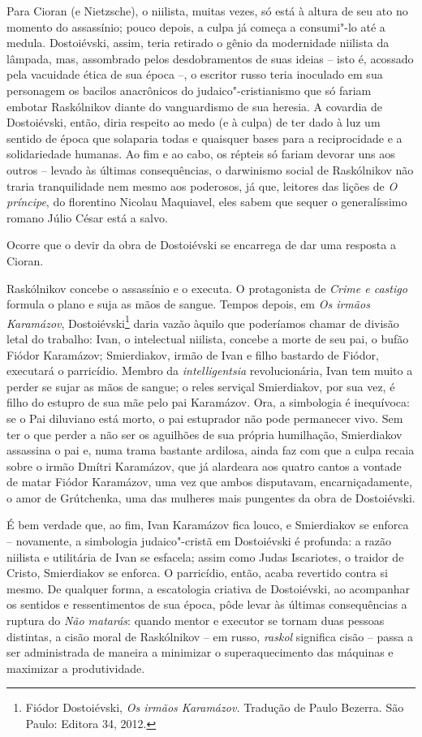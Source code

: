 Para Cioran (e Nietzsche), o niilista, muitas vezes, só está à altura de
seu ato no momento do assassínio; pouco depois, a culpa já começa a
consumi"-lo até a medula. Dostoiévski, assim, teria retirado o gênio da
modernidade niilista da lâmpada, mas, assombrado pelos desdobramentos de
suas ideias -- isto é, acossado pela vacuidade ética de sua época --, o
escritor russo teria inoculado em sua personagem os bacilos anacrônicos
do judaico"-cristianismo que só fariam embotar Raskólnikov diante do
vanguardismo de sua heresia. A covardia de Dostoiévski, então, diria
respeito ao medo (e à culpa) de ter dado à luz um sentido de época que
solaparia todas e quaisquer bases para a reciprocidade e a solidariedade
humanas. Ao fim e ao cabo, os répteis só fariam devorar uns aos outros
-- levado às últimas consequências, o darwinismo social de Raskólnikov
não traria tranquilidade nem mesmo aos poderosos, já que, leitores das
lições de \emph{O príncipe}, do florentino Nicolau Maquiavel, eles sabem
que sequer o generalíssimo romano Júlio César está a salvo.

Ocorre que o devir da obra de Dostoiévski se encarrega de dar uma
resposta a Cioran.

Raskólnikov concebe o assassínio e o executa. O protagonista de
\emph{Crime e castigo} formula o plano e suja as mãos de sangue. Tempos
depois, em \emph{Os irmãos Karamázov}, Dostoiévski\footnote{Fiódor
  Dostoiévski, \emph{Os irmãos Karamázov.} Tradução de Paulo Bezerra.
  São Paulo: Editora 34, 2012.} daria vazão àquilo que poderíamos chamar
de divisão letal do trabalho: Ivan, o intelectual niilista, concebe a
morte de seu pai, o bufão Fiódor Karamázov; Smierdiakov, irmão de Ivan e
filho bastardo de Fiódor, executará o parricídio. Membro da
\emph{intelligentsia} revolucionária, Ivan tem muito a perder se sujar
as mãos de sangue; o reles serviçal Smierdiakov, por sua vez, é filho do
estupro de sua mãe pelo pai Karamázov. Ora, a simbologia é inequívoca:
se o Pai diluviano está morto, o pai estuprador não pode permanecer
vivo. Sem ter o que perder a não ser os aguilhões de sua própria
humilhação, Smierdiakov assassina o pai e, numa trama bastante ardilosa,
ainda faz com que a culpa recaia sobre o irmão Dmítri Karamázov, que já
alardeara aos quatro cantos a vontade de matar Fiódor Karamázov, uma vez
que ambos disputavam, encarniçadamente, o amor de Grútchenka, uma das
mulheres mais pungentes da obra de Dostoiévski.

É bem verdade que, ao fim, Ivan Karamázov fica louco, e Smierdiakov se
enforca -- novamente, a simbologia judaico"-cristã em Dostoiévski é
profunda: a razão niilista e utilitária de Ivan se esfacela; assim como
Judas Iscariotes, o traidor de Cristo, Smierdiakov se enforca. O
parricídio, então, acaba revertido contra si mesmo. De qualquer forma, a
escatologia criativa de Dostoiévski, ao acompanhar os sentidos e
ressentimentos de sua época, pôde levar às últimas consequências a
ruptura do \emph{Não matarás}: quando mentor e executor se tornam duas
pessoas distintas, a cisão moral de Raskólnikov -- em russo,
\emph{raskol} significa cisão -- passa a ser administrada de maneira a
minimizar o superaquecimento das máquinas e maximizar a produtividade.

